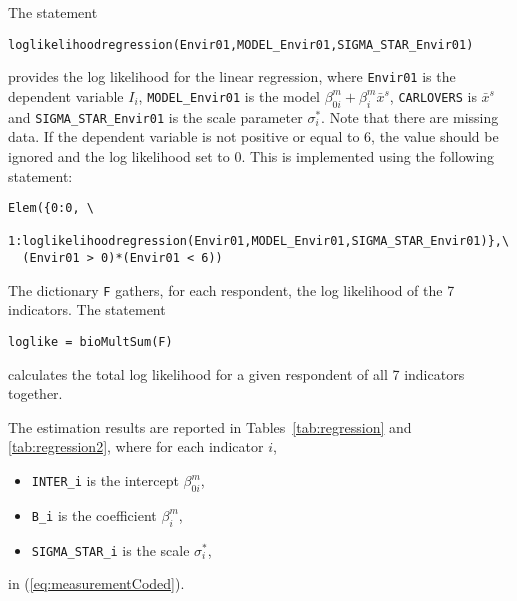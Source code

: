 \documentclass[12pt,a4paper]{article}
\newcommand{\req}[1]{(\ref{#1})}
\begin{document}
The statement 
\begin{lstlisting}
loglikelihoodregression(Envir01,MODEL_Envir01,SIGMA_STAR_Envir01)
\end{lstlisting}
provides the log likelihood for the linear regression, where
\lstinline$Envir01$ is the dependent variable $I_i$,
\lstinline$MODEL_Envir01$ is the model $\beta_{0i}^m +\beta^m_i
\bar{x}^s$, \lstinline$CARLOVERS$ is $\bar{x}^s$ and
\lstinline$SIGMA_STAR_Envir01$ is the scale parameter $\sigma_i^*$. Note that there are
missing data. If the dependent variable is not positive or equal to 6, the value
should be ignored and the log
likelihood set to 0. This is implemented using the following
statement: 
\begin{lstlisting}
Elem({0:0, \
 1:loglikelihoodregression(Envir01,MODEL_Envir01,SIGMA_STAR_Envir01)},\
  (Envir01 > 0)*(Envir01 < 6)) 
\end{lstlisting}
The dictionary \lstinline$F$ gathers, for each respondent, the log
likelihood of the 7 indicators. The statement 
\begin{lstlisting}
loglike = bioMultSum(F)
\end{lstlisting}
calculates the total log likelihood for a given respondent of all 7
indicators together. 

The estimation results are reported in Tables~\ref{tab:regression} and
\ref{tab:regression2}, where for each indicator $i$,
\begin{itemize}
\item \lstinline$INTER_i$ is the intercept $\beta_{0i}^m$,
\item \lstinline$B_i$ is the coefficient $\beta^m_i$,
\item \lstinline$SIGMA_STAR_i$ is the scale $\sigma_i^*$,
\end{itemize}
in \req{eq:measurementCoded}.
\end{document}
